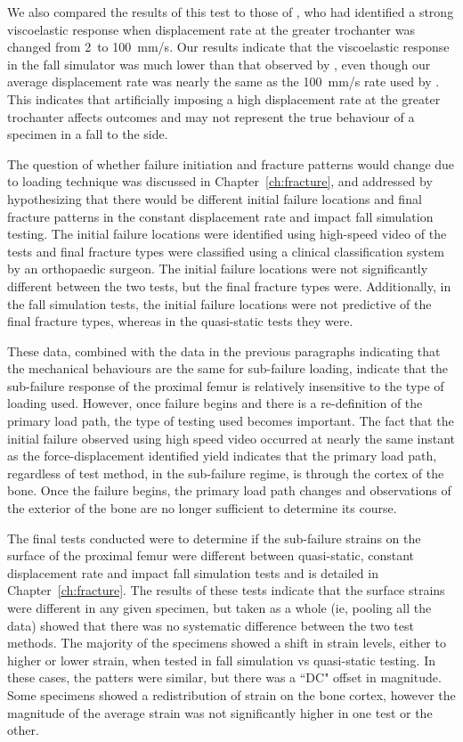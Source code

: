 We also compared the results of this test to those of \citet{courtney_effects_1994}, who had identified a strong viscoelastic response when displacement rate at the greater trochanter was changed from 2~to 100~\ac{mm}/\ac{s}.
Our results indicate that the viscoelastic response in the fall simulator was much lower than that observed by \citet{courtney_effects_1994}, even though our average displacement rate was nearly the same as the 100~\ac{mm}/\ac{s} rate used by \citet{courtney_effects_1994}.
This indicates that artificially imposing a high displacement rate at the greater trochanter affects outcomes and may not represent the true behaviour of a specimen in a fall to the side.

The question of whether failure initiation and fracture patterns would change due to loading technique was discussed in Chapter~\ref{ch:fracture}, and addressed by hypothesizing that there would be different initial failure locations and final fracture patterns in the constant displacement rate and impact fall simulation testing.
The initial failure locations were identified using high-speed video of the tests and final fracture types were classified using a clinical classification system by an orthopaedic surgeon.
The initial failure locations were not significantly different between the two tests, but the final fracture types were.
Additionally, in the fall simulation tests, the initial failure locations were not predictive of the final fracture types, whereas in the quasi-static tests they were.

These data, combined with the data in the previous paragraphs indicating that the mechanical behaviours are the same for sub-failure loading, indicate that the sub-failure response of the proximal femur is relatively insensitive to the type of loading used.
However, once failure begins and there is a re-definition of the primary load path, the type of testing used becomes important.
The fact that the initial failure observed using high speed video occurred at nearly the same instant as the force-displacement identified yield indicates that the primary load path, regardless of test method, in the sub-failure regime, is through the cortex of the bone.
Once the failure begins, the primary load path changes and observations of the exterior of the bone are no longer sufficient to determine its course.

The final tests conducted were to determine if the sub-failure strains on the surface of the proximal femur were different between quasi-static, constant displacement rate and impact fall simulation tests and is detailed in Chapter~\ref{ch:fracture}.
The results of these tests indicate that the surface strains were different in any given specimen, but taken as a whole (\ac{ie}, pooling all the data) showed that there was no systematic difference between the two test methods.
The majority of the specimens showed a shift in strain levels, either to higher or lower strain, when tested in fall simulation \ac{vs} quasi-static testing.
In these cases, the patters were similar, but there was a ``DC" offset in magnitude.
Some specimens showed a redistribution of strain on the bone cortex, however the magnitude of the average strain was not significantly higher in one test or the other.


